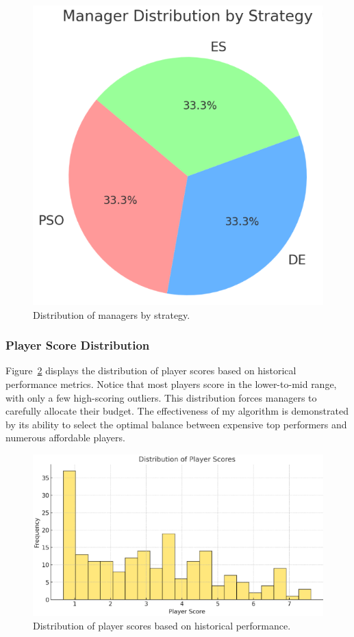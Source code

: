 \documentclass[sigconf]{acmart}
\begin{document}
	\begin{figure}[H]
		\centering
		\includegraphics[width=0.6\linewidth]{plot/manager_distribution.png}
		\caption{Distribution of managers by strategy.}
		\label{fig:manager_distribution}
	\end{figure}
	
	\subsubsection{Player Score Distribution}
	Figure~\ref{fig:player_scores} displays the distribution of player scores based on historical performance metrics. Notice that most players score in the lower-to-mid range, with only a few high-scoring outliers. This distribution forces managers to carefully allocate their budget. The effectiveness of my algorithm is demonstrated by its ability to select the optimal balance between expensive top performers and numerous affordable players.
	
	\begin{figure}[H]
		\centering
		\includegraphics[width=0.8\linewidth]{plot/player_score_distribution.png}
		\caption{Distribution of player scores based on historical performance.}
		\label{fig:player_scores}
	\end{figure}
	
\end{document}
